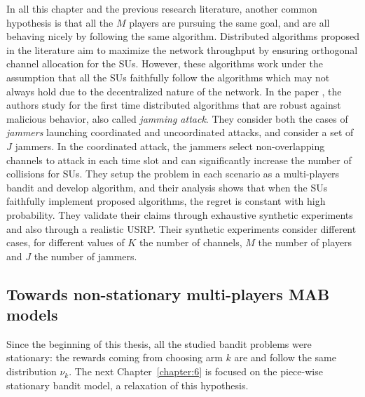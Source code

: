 In all this chapter and the previous research literature, another common hypothesis is that all the $M$ players are pursuing the same goal, and are all behaving nicely by following the same algorithm.
Distributed algorithms proposed in the literature aim to maximize the network throughput by ensuring orthogonal channel allocation for the SUs.
However, these algorithms work under the assumption that all the SUs faithfully follow the algorithms which may not always hold due to the decentralized nature of the network.
In the paper \cite{SawantKumar2018}, the authors study for the first time distributed algorithms that are robust against malicious behavior, also called \emph{jamming attack}.
They consider both the cases of \emph{jammers} launching coordinated and uncoordinated attacks, and consider a set of $J$ jammers.
In the coordinated attack, the jammers select non-overlapping channels to attack in each time slot and can significantly increase the number of collisions for SUs.
They setup the problem in each scenario as a multi-players bandit and develop algorithm,
and their analysis shows that when the SUs faithfully implement proposed algorithms, the regret is constant with high probability.
They validate their claims through exhaustive synthetic experiments and also through a realistic USRP.
Their synthetic experiments consider different cases, for different values of $K$ the number of channels, $M$ the number of players and $J$ the number of jammers.



\subsection{Towards non-stationary multi-players MAB models}
\label{sub:5:towardsNonStationaryModels}

Since the beginning of this thesis, all the studied bandit problems were stationary: the rewards coming from choosing arm $k$ are \iid{} and follow the same distribution $\nu_k$.
The next Chapter~\ref{chapter:6} is focused on the piece-wise stationary bandit model, a relaxation of this hypothesis.

